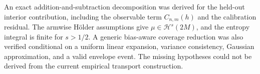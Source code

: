 An exact addition-and-subtraction decomposition was derived for the held-out interior contribution, including the observable term \(C_{n,m}(h)\) and the calibration residual. The armwise Hölder assumptions give \(\mu\in\mathcal H^s(2M)\), and the entropy integral is finite for \(s>1/2\). A generic bias-aware coverage reduction was also verified conditional on a uniform linear expansion, variance consistency, Gaussian approximation, and a valid envelope event. The missing hypotheses could not be derived from the current empirical transport construction.